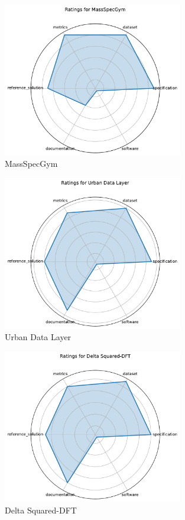 \documentclass{article}
\begin{document}
\begin{figure}[h!]
  \centering
  \includegraphics[width=0.7\textwidth]{MassSpecGym_radar.pdf}
  \caption{MassSpecGym}
\end{figure}

\begin{figure}[h!]
  \centering
  \includegraphics[width=0.7\textwidth]{Urban Data Layer_radar.pdf}
  \caption{Urban Data Layer}
\end{figure}

\begin{figure}[h!]
  \centering
  \includegraphics[width=0.7\textwidth]{Delta Squared-DFT_radar.pdf}
  \caption{Delta Squared-DFT}
\end{figure}
\end{document}

